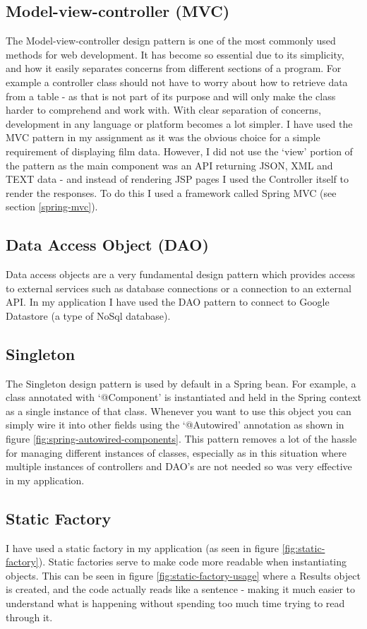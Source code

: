 \documentclass[12pt]{article}
\begin{document}
  \subsection{Model-view-controller (MVC)}
    The Model-view-controller \citep{krasner1988description} design pattern is one of the most commonly used methods for web development. It has become so essential due to its simplicity, and how it easily separates concerns from different sections of a program. For example a controller class should not have to worry about how to retrieve data from a table - as that is not part of its purpose and will only make the class harder to comprehend and work with. With clear separation of concerns, development in any language or platform becomes a lot simpler. I have used the MVC pattern in my assignment as it was the obvious choice for a simple requirement of displaying film data. However, I did not use the ‘view’ portion of the pattern as the main component was an API returning JSON, XML and TEXT data - and instead of rendering JSP pages I used the Controller itself to render the responses. To do this I used a framework called Spring MVC (see section \ref{spring-mvc}).

  \subsection{Data Access Object (DAO)}
    Data access objects are a very fundamental design pattern which provides access to external services such as database connections or a connection to an external API. In my application I have used the DAO pattern to connect to Google Datastore (a type of NoSql database).

  \subsection{Singleton}
    The Singleton design pattern is used by default in a Spring bean. For example, a class annotated with ‘@Component’ is instantiated and held in the Spring context as a single instance of that class. Whenever you want to use this object you can simply wire it into other fields using the ‘@Autowired’ annotation as shown in figure \ref{fig:spring-autowired-components}. This pattern removes a lot of the hassle for managing different instances of classes, especially as in this situation where multiple instances of controllers and DAO's are not needed so was very effective in my application.

  \subsection{Static Factory}
    I have used a static factory in my application (as seen in figure \ref{fig:static-factory}). Static factories serve to make code more readable when instantiating objects. This can be seen in figure \ref{fig:static-factory-usage} where a Results object is created, and the code actually reads like a sentence - making it much easier to understand what is happening without spending too much time trying to read through it.
\end{document}
